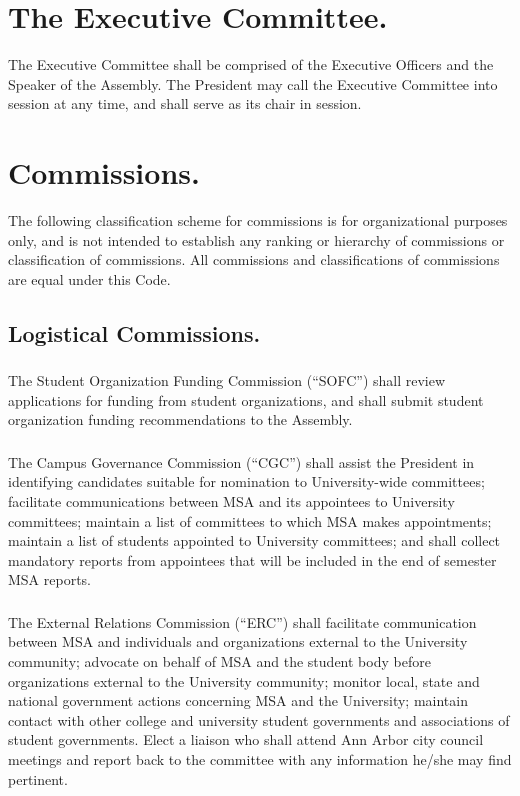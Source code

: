 \section{The Executive Committee.}
The Executive Committee shall be comprised of the Executive Officers and the Speaker of the Assembly.  The President may call the Executive Committee into session at any time, and shall serve as its chair in session.


\section{Commissions.}
The following classification scheme for commissions is for organizational purposes only, and is not intended to establish any ranking or hierarchy of commissions or classification of commissions.  All commissions and classifications of commissions are equal under this Code.

\subsection{Logistical Commissions.}

\subsubsection{}
The Student Organization Funding Commission (``SOFC'') shall review applications for funding from student organizations, and shall submit student organization funding recommendations to the Assembly.

\subsubsection{}
The Campus Governance Commission (``CGC'') shall
\subsubsubsection{}
assist the President in identifying candidates suitable for nomination to University-wide committees;
\subsubsubsection{}
facilitate communications between MSA and its appointees to University committees; 
\subsubsubsection{}
maintain a list of committees to which MSA makes appointments;
\subsubsubsection{}
maintain a list of students appointed to University committees; and
\subsubsubsection{}
shall collect mandatory reports from appointees that will be included in the end of semester MSA reports.

\subsubsection{}
The External Relations Commission (``ERC'') shall
\subsubsubsection{}
facilitate communication between MSA and individuals and organizations external to the University community;
\subsubsubsection{}
advocate on behalf of MSA and the student body before organizations external to the University community;
\subsubsubsection{}
monitor local, state and national government actions concerning MSA and the University;
\subsubsubsection{}
maintain contact with other college and university student governments and associations of student governments.
\subsubsubsection{}
Elect a liaison who shall attend Ann Arbor city council meetings and report back to the committee with any information he/she may find pertinent.

